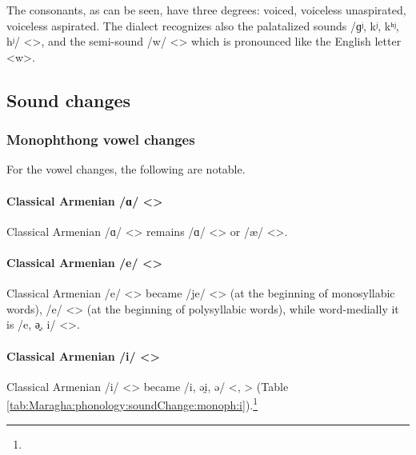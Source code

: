 
The consonants, as can be seen, have three degrees: voiced, voiceless unaspirated, voiceless aspirated. The dialect recognizes also the palatalized sounds /ɡʲ, kʲ, kʰʲ, hʲ/ <>, and the semi-sound /w/ <> which is pronounced like the English letter <w>. 

\subsection{Sound changes}
\subsubsection{Monophthong vowel changes}
For the vowel changes, the following are notable.

\paragraph{Classical Armenian /ɑ/ <> }
Classical Armenian /ɑ/ <> remains /ɑ/ <> or /æ/ <>.

\paragraph{Classical Armenian /e/ <> }
Classical Armenian /e/ <> became /je/ <> (at the beginning of monosyllabic words), /e/ <> (at the beginning of polysyllabic words), while word-medially it is /e, ə̟, i/ <>.





\begin{adjarianpage}\label{page:282}\end{adjarianpage}%


\paragraph{Classical Armenian /i/ <> }
Classical Armenian /i/ <> became /i, əi̯, ə/ <, > (Table \ref{tab:Maragha:phonology:soundChange:monoph:i}).\footnote{}





